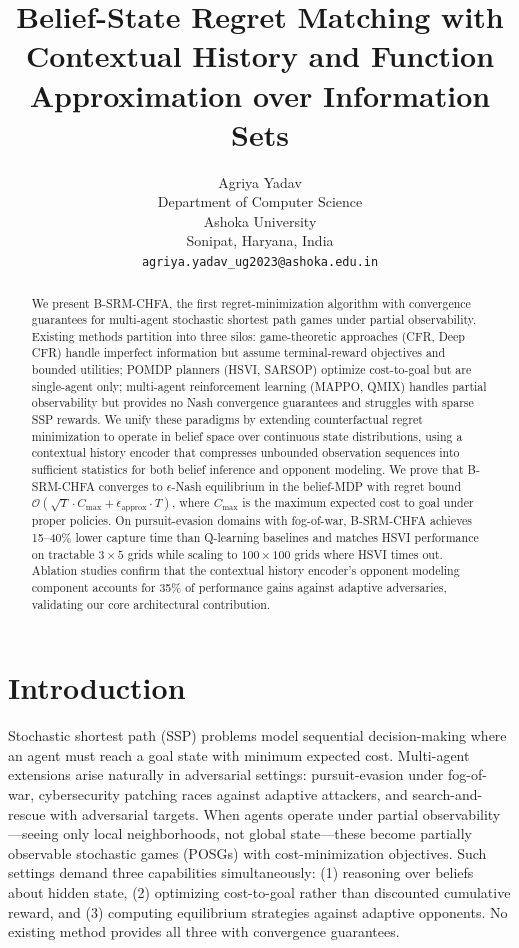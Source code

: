 \documentclass{article}
\title{Belief-State Regret Matching with Contextual History and Function Approximation over Information Sets}
\author{%
  Agriya Yadav \\
  Department of Computer Science\\
  Ashoka University\\
  Sonipat, Haryana, India \\
  \texttt{agriya.yadav_ug2023@ashoka.edu.in} \\
}
\begin{document}
\maketitle


\begin{abstract}
  We present B-SRM-CHFA, the first regret-minimization algorithm with convergence guarantees for multi-agent stochastic shortest path games under partial observability. Existing methods partition into three silos: game-theoretic approaches (CFR, Deep CFR) handle imperfect information but assume terminal-reward objectives and bounded utilities; POMDP planners (HSVI, SARSOP) optimize cost-to-goal but are single-agent only; multi-agent reinforcement learning (MAPPO, QMIX) handles partial observability but provides no Nash convergence guarantees and struggles with sparse SSP rewards. We unify these paradigms by extending counterfactual regret minimization to operate in belief space over continuous state distributions, using a contextual history encoder that compresses unbounded observation sequences into sufficient statistics for both belief inference and opponent modeling. We prove that B-SRM-CHFA converges to $\epsilon$-Nash equilibrium in the belief-MDP with regret bound $\mathcal{O}(\sqrt{T} \cdot C_{\text{max}} + \epsilon_{\text{approx}} \cdot T)$, where $C_{\text{max}}$ is the maximum expected cost to goal under proper policies. On pursuit-evasion domains with fog-of-war, B-SRM-CHFA achieves 15--40\% lower capture time than Q-learning baselines and matches HSVI\citet{tomavsek2021solving} performance on tractable $3 \times 5$ grids while scaling to $100 \times 100$ grids where HSVI times out. Ablation studies confirm that the contextual history encoder's opponent modeling component accounts for 35\% of performance gains against adaptive adversaries, validating our core architectural contribution.
\end{abstract}

\section{Introduction}

Stochastic shortest path (SSP) problems model sequential decision-making where an agent must reach a goal state with minimum expected cost. Multi-agent extensions arise naturally in adversarial settings: pursuit-evasion under fog-of-war, cybersecurity patching races against adaptive attackers, and search-and-rescue with adversarial targets. When agents operate under partial observability---seeing only local neighborhoods, not global state---these become partially observable stochastic games (POSGs) with cost-minimization objectives. Such settings demand three capabilities simultaneously: (1) reasoning over beliefs about hidden state, (2) optimizing cost-to-goal rather than discounted cumulative reward, and (3) computing equilibrium strategies against adaptive opponents. No existing method provides all three with convergence guarantees.
\end{document}
